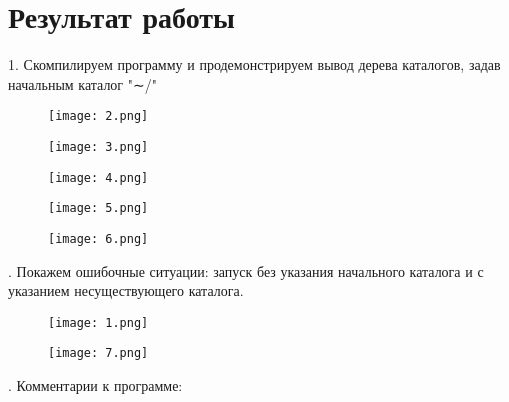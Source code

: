 \section*{Результат работы}
1. Скомпилируем программу и продемонстрируем вывод дерева каталогов, задав начальным каталог "∼/"
\begin{figure}[h!]
\center\texttt{[image: 2.png]}
\end{figure}
\begin{figure}[h!]
\center\texttt{[image: 3.png]}
\end{figure}
\newpage
\begin{figure}[h!]
	\center\texttt{[image: 4.png]}
\end{figure}
\begin{figure}[h!]
	\center\texttt{[image: 5.png]}
\end{figure}
\begin{figure}[h!]
	\center\texttt{[image: 6.png]}
\end{figure}
. Покажем ошибочные ситуации: запуск без указания начального каталога и с указанием несуществующего каталога.
\begin{figure}[h!]
	\center\texttt{[image: 1.png]}
\end{figure}
\begin{figure}[h!]
	\center\texttt{[image: 7.png]}
\end{figure}
. Комментарии к программе:
